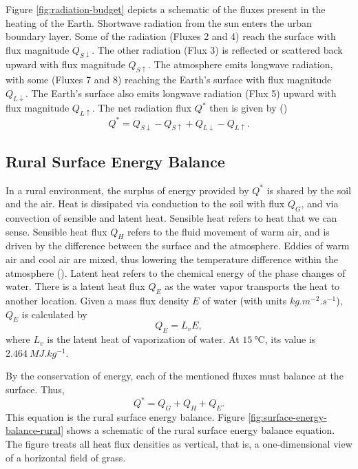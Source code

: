 		Figure \ref{fig:radiation-budget} depicts a schematic of the fluxes present in the heating of the Earth.
		Shortwave radiation from the sun enters the urban boundary layer.
		Some of the radiation (Fluxes 2 and 4) reach the surface with flux magnitude $Q_{S\downarrow}$.
		The other radiation (Flux 3) is reflected or scattered back upward with flux magnitude $Q_{S\uparrow}$.
		The atmosphere emits longwave radiation, with some (Fluxes 7 and 8)
		reaching the Earth’s surface with flux magnitude $Q_{L\downarrow}$.
		The Earth’s surface also emits longwave radiation (Flux 5) upward with flux magnitude $Q_{L\uparrow}$.
		The net radiation flux $Q^*$ then is given by (\cite{Wallace2006})
		\begin{equation}
			Q^* = Q_{S\downarrow} - Q_{S\uparrow} + Q_{L\downarrow} - Q_{L\uparrow}.
		\end{equation}

	\subsection{Rural Surface Energy Balance}
			
		In a rural environment, the surplus of energy provided by $Q^*$ is shared by the soil and the air.
		Heat is dissipated via conduction to the soil with flux $Q_G$,
			and via convection of sensible and latent heat.
		Sensible heat refers to heat that we can sense.
		Sensible heat flux $Q_H$ refers to the fluid movement of warm air, and is driven by the difference between the surface and the atmosphere.
		Eddies of warm air and cool air are mixed, thus lowering the temperature difference within the atmosphere (\cite{Oke2017urban}).	
		Latent heat refers to the chemical energy of the phase changes of water. 
		There is a latent heat flux $Q_E$ as the water vapor transports the heat to another location.
		Given a mass flux density $E$ of water (with units $\si{kg.m^{-2}.s^{-1}}$), $Q_E$ is calculated by
		\begin{equation}
			Q_E = L_v E,
		\end{equation}
		where $L_v$ is the latent heat of vaporization of water.
		At $\qty{15}{\unit{\degreeCelsius}}$, its value is $\qty{2.464}{MJ.kg^{-1}}$.
		
		By the conservation of energy, each of the mentioned fluxes must balance at the surface.
		Thus,
		\begin{equation}
			Q^* = Q_G + Q_H + Q_E.
		\end{equation}
		This equation is the rural surface energy balance.
		Figure \ref{fig:surface-energy-balance-rural} shows a schematic of the rural surface energy balance equation. The figure treats all heat flux densities as vertical, that is, a one-dimensional view of a horizontal field of grass.
		
